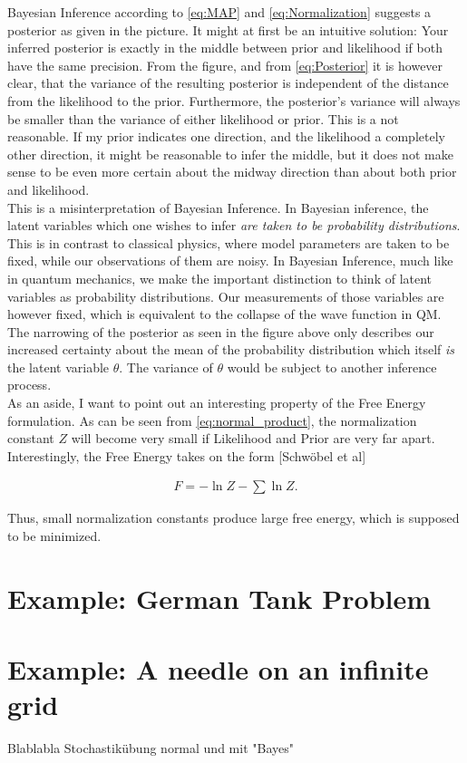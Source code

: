 Bayesian Inference according to \eqref{eq:MAP} and \eqref{eq:Normalization} suggests a posterior as given in the picture. It might at first be an intuitive solution: Your inferred posterior is exactly in the middle between prior and likelihood if both have the same precision. From the figure, and from \eqref{eq:Posterior} it is however clear, that the variance of the resulting posterior is independent of the distance from the likelihood to the prior. Furthermore, the posterior's variance will always be smaller than the variance of either likelihood or prior. This is a not reasonable. If my prior indicates one direction, and the likelihood a completely other direction, it might be reasonable to infer the middle, but it does not make sense to be even more certain about the midway direction than about both prior and likelihood. \\

This is a misinterpretation of Bayesian Inference. In Bayesian inference, the latent variables which one wishes to infer \textit{are taken to be probability distributions}. This is in contrast to classical physics, where model parameters are taken to be fixed, while our observations of them are noisy. In Bayesian Inference, much like in quantum mechanics, we make the important distinction to think of latent variables as probability distributions. Our measurements of those variables are however fixed, which is equivalent to the collapse of the wave function in QM. The narrowing of the posterior as seen in the figure above only describes our increased certainty about the mean of the probability distribution which itself \textit{is} the latent variable $\theta$. The variance of $\theta$ would be subject to another inference process. \\

As an aside, I want to point out an interesting property of the Free Energy formulation. As can be seen from \eqref{eq:normal_product}, the normalization constant $Z$ will become very small if Likelihood and Prior are very far apart. Interestingly, the Free Energy takes on the form [Schwöbel et al]

\begin{align}
F = -\ln Z -\sum \ln Z.
\end{align} 

Thus, small normalization constants produce large free energy, which is supposed to be minimized.

\section{Example: German Tank Problem}

\section{Example: A needle on an infinite grid}
Blablabla Stochastikübung normal und mit "Bayes"
